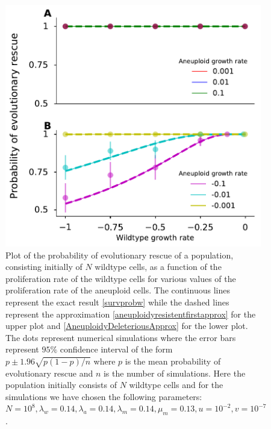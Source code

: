 \documentclass[12pt]{extarticle}
\begin{document}
\begin{figure}[!t]
 \vspace*{1\baselineskip}
\includegraphics[width=1\textwidth]{Figures/CombinedSubplotLargePop.pdf}
\caption{Plot of the probability of evolutionary rescue of a population, consisting initially of $N$ wildtype cells, as a function of the proliferation rate of the wildtype cells for various values of the proliferation rate of the aneuploid cells. The continuous lines represent the exact result \eqref{survprobw} while the dashed lines represent the approximation \eqref{aneuploidyresistentfirstapprox} for the upper plot and \eqref{AneuploidyDeleteriousApprox} for the lower plot. The dots represent numerical simulations where the error bars represent $95\%$ confidence interval of the form $p\pm1.96\sqrt{p\left(1-p\right)/n}$ where $p$ is the mean probability of evolutionary rescue and $n$ is the number of simulations.  Here the population initially consists of $N$ wildtype cells and for the simulations we have chosen the following parameters: $N=10^8, \lambda_w=0.14, \lambda_a=0.14,\lambda_m=0.14,\mu_m=0.13, u=10^{-2}, v=10^{-7}$. }
\label{SurvPlotLargeN}
\end{figure}
\end{document}
